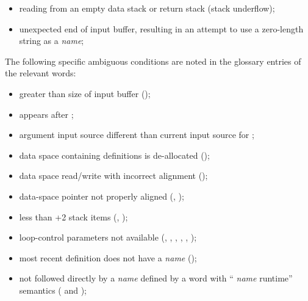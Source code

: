 \begin{itemize}
\item reading from an empty data stack or return stack
	(stack underflow);

\item unexpected end of input buffer, resulting in an attempt to
	use a zero-length string as a \emph{name};

\end{itemize}


The following specific ambiguous conditions are noted in the
glossary entries of the relevant words:

\begin{itemize}

\item {} greater than size of input buffer
	();

\item {} appears after
	;

\item argument input source different than current input source for
	;

\item data space containing definitions is de-allocated
	();

\item data space read/write with incorrect alignment
	();

\item data-space pointer not properly aligned
	(, );

\item less than +2 stack items (,
	);

\item loop-control parameters not available
	(,
	 ,
	 ,
	 ,
	 ,
	 );

\item most recent definition does not have a \emph{name}
	();

\item {} not followed directly by a \emph{name}
	defined by a word with `` \emph{name} runtime''
	semantics ( and
	);


\end{itemize}
